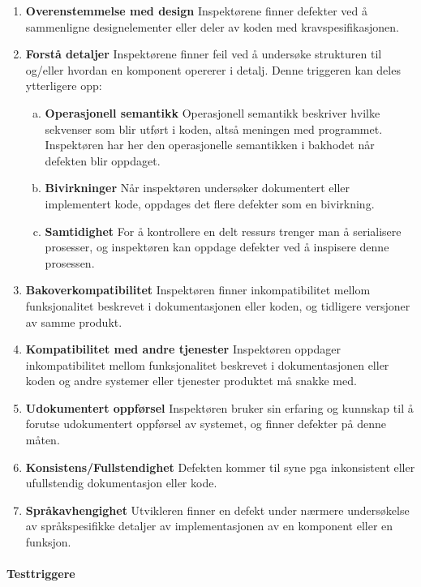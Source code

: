 \begin{enumerate}[1.]
\item
  \textbf{Overenstemmelse med design} Inspektørene finner defekter ved å
  sammenligne designelementer eller deler av koden med
  kravspesifikasjonen.
\item
  \textbf{Forstå detaljer} Inspektørene finner feil ved å undersøke
  strukturen til og/eller hvordan en komponent opererer i detalj. Denne
  triggeren kan deles ytterligere opp:

  \begin{enumerate}[a.]
  \item
    \textbf{Operasjonell semantikk} Operasjonell semantikk beskriver
    hvilke sekvenser som blir utført i koden, altså meningen med
    programmet. Inspektøren har her den operasjonelle semantikken i
    bakhodet når defekten blir oppdaget.
  \item
    \textbf{Bivirkninger} Når inspektøren undersøker dokumentert eller
    implementert kode, oppdages det flere defekter som en bivirkning.
  \item
    \textbf{Samtidighet} For å kontrollere en delt ressurs trenger man å
    serialisere prosesser, og inspektøren kan oppdage defekter ved å
    inspisere denne prosessen.
  \end{enumerate}
\item
  \textbf{Bakoverkompatibilitet} Inspektøren finner inkompatibilitet
  mellom funksjonalitet beskrevet i dokumentasjonen eller koden, og
  tidligere versjoner av samme produkt.
\item
  \textbf{Kompatibilitet med andre tjenester} Inspektøren oppdager
  inkompatibilitet mellom funksjonalitet beskrevet i dokumentasjonen
  eller koden og andre systemer eller tjenester produktet må snakke med.
\item
  \textbf{Udokumentert oppførsel} Inspektøren bruker sin erfaring og
  kunnskap til å forutse udokumentert oppførsel av systemet, og finner
  defekter på denne måten.
\item
  \textbf{Konsistens/Fullstendighet} Defekten kommer til syne pga
  inkonsistent eller ufullstendig dokumentasjon eller kode.
\item
  \textbf{Språkavhengighet} Utvikleren finner en defekt under nærmere
  undersøkelse av språkspesifikke detaljer av implementasjonen av en
  komponent eller en funksjon.
\end{enumerate}
\paragraph{Testtriggere}

